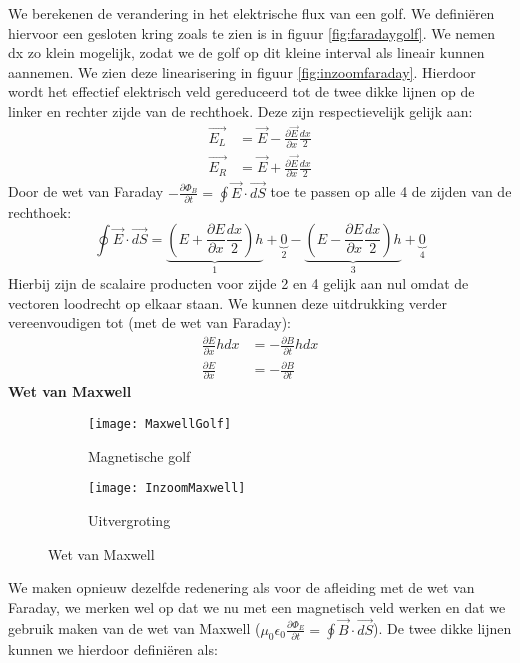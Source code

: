 \documentclass[a4paper,kul]{kulakarticle} %
\begin{document}
We berekenen de verandering in het elektrische flux van een golf. We definiëren hiervoor een gesloten kring zoals te zien is in figuur \ref{fig:faradaygolf}. We nemen dx zo klein mogelijk, zodat we de golf op dit kleine interval als lineair kunnen aannemen. We zien deze linearisering in figuur \ref{fig:inzoomfaraday}. Hierdoor wordt het effectief elektrisch veld gereduceerd tot de twee dikke lijnen op de linker en rechter zijde van de rechthoek. Deze zijn respectievelijk gelijk aan:
\begin{align*}
	\vec{E_L} &= \vec{E}-\frac{\partial\vec{E}}{\partial x}\frac{dx}{2}\\
	\vec{E_R} &= \vec{E}+\frac{\partial\vec{E}}{\partial x}\frac{dx}{2}	
\end{align*}
Door de wet van Faraday $-\frac{\partial\Phi_B}{\partial t}= \oint\vec{E}\cdot\vec{dS}$ toe te passen op alle 4 de zijden van de rechthoek:
\begin{equation*}
	\oint\vec{E}\cdot\vec{dS} = \underbrace{(E+\frac{\partial E}{\partial x}\frac{dx}{2})h}_1 + \underbrace{0}_2 -\underbrace{(E-\frac{\partial E}{\partial x}\frac{dx}{2})h}_3 + \underbrace{0}_4
\end{equation*}
Hierbij zijn de scalaire producten voor zijde 2 en 4 gelijk aan nul omdat de vectoren loodrecht op elkaar staan. We kunnen deze uitdrukking verder vereenvoudigen tot (met de wet van Faraday):
\begin{align}
	 \frac{\partial E}{\partial x}hdx &= -\frac{\partial B}{\partial t}hdx\\
	 \label{eq:inductieFaraday}
	 \frac{\partial E}{\partial x} &= -\frac{\partial B}{\partial t}
\end{align}
\newpage
\textbf{Wet van Maxwell}\\
\begin{figure}[h]
	\centering
	\begin{subfigure}{.5\textwidth}
		\centering
		\texttt{[image: MaxwellGolf]}
		\caption[Golf Maxwell]{Magnetische golf}
		\label{fig:maxwellgolf}
	\end{subfigure}%
	\begin{subfigure}{.5\textwidth}
		\centering
		\texttt{[image: InzoomMaxwell]}
		\caption[Inzoom maxwell]{Uitvergroting}
		\label{fig:inzoommaxwell}
	\end{subfigure}
	\caption{Wet van Maxwell}
	\label{fig:InductieMaxwell}
\end{figure}
We maken opnieuw dezelfde redenering als voor de afleiding met de wet van Faraday, we merken wel op dat we nu met een magnetisch veld werken en dat we gebruik maken van de wet van Maxwell ($\mu_0\epsilon_0\frac{\partial \Phi_E}{\partial t}=\oint\vec{B}\cdot\vec{dS}$). De twee dikke lijnen kunnen we hierdoor definiëren als:
\end{document}
